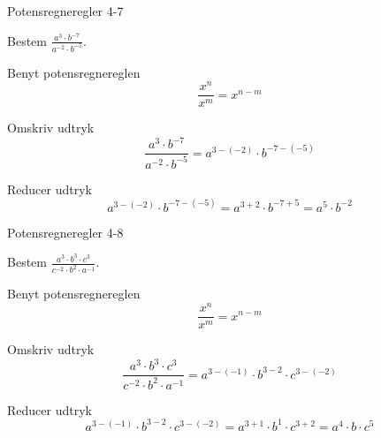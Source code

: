 \documentclass{article}
\begin{document}
\newpage

\begin{exercise}{Potensregneregler 4-7}

Bestem $\frac{a^3 \cdot b^{-7}}{a^{-2}\cdot b^{-5}}$.


\hint

Benyt potensregnereglen
\[
\frac{x^n}{x^m} = x^{n - m}
\]

\hint

Omskriv udtryk
\[
\frac{a^3 \cdot b^{-7}}{a^{-2}\cdot b^{-5}} = a^{3-(-2)} \cdot b^{-7-(-5)}
\]

\hint

Reducer udtryk
\[
a^{3-(-2)} \cdot b^{-7-(-5)} = a^{3 + 2} \cdot b^{-7 + 5} = a^5 \cdot b^{-2}
\]


\end{exercise}

\newpage

\begin{exercise}{Potensregneregler 4-8}

Bestem $\frac{a^3 \cdot b^3 \cdot c^3}{c^{-2} \cdot b^2 \cdot a^{-1}}$.


\hint

Benyt potensregnereglen
\[
\frac{x^n}{x^m} = x^{n - m}
\]

\hint

Omskriv udtryk
\[
\frac{a^3 \cdot b^3 \cdot c^3}{c^{-2} \cdot b^2 \cdot a^{-1}} = a^{3-(-1)} \cdot b^{3 - 2} \cdot c^{3 - (-2)}
\]

\hint

Reducer udtryk
\[
a^{3-(-1)} \cdot b^{3 - 2} \cdot c^{3 - (-2)} = a^{3 + 1} \cdot b^1 \cdot c^{3 + 2} = a^4 \cdot b \cdot c^5
\]


\end{exercise}
\end{document}
